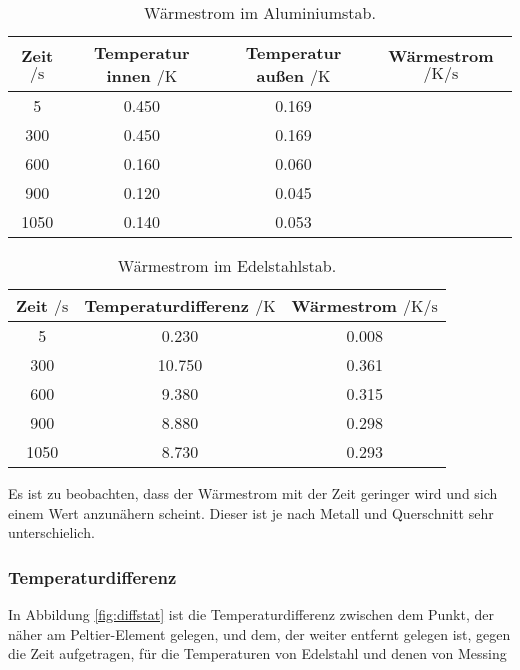   \begin{table}
    \centering
    \caption{Wärmestrom im Aluminiumstab.}
    \label{tabl:stroma}
    \begin{tabular}{c c c c}
      \toprule
      Zeit $\mathbin{/} \si{\s}$ & Temperatur innen $\mathbin{/} \si{\kelvin}$& Temperatur außen $\mathbin{/} \si{\kelvin}$& Wärmestrom $\mathbin{/} \si{\kelvin\per\s}$\\
      \midrule
      5 & 0.450 & 0.169\\
      300 & 0.450 & 0.169\\
      600 & 0.160 & 0.060\\
      900 & 0.120 & 0.045\\
      1050 & 0.140 & 0.053\\
      \bottomrule
    \end{tabular}
  \end{table}

  \begin{table}
    \centering
    \caption{Wärmestrom im Edelstahlstab.}
    \label{tabl:strome}
    \begin{tabular}{c c c}
      \toprule
      Zeit $\mathbin{/} \si{\s}$ & Temperaturdifferenz $\mathbin{/} \si{\kelvin}$& Wärmestrom $\mathbin{/} \si{\kelvin\per\s}$\\
      \midrule
      5 & 0.230& 0.008\\
      300 & 10.750 & 0.361 \\
      600 & 9.380 & 0.315\\
      900 & 8.880 & 0.298\\%
      1050 & 8.730 & 0.293\\%
      \bottomrule
    \end{tabular}
  \end{table}
  \FloatBarrier
  \noindent Es ist zu beobachten, dass der Wärmestrom mit der Zeit geringer wird und sich einem Wert anzunähern scheint. Dieser ist je nach Metall und Querschnitt 
  sehr unterschielich. %

  \subsubsection{Temperaturdifferenz}
  In Abbildung \ref{fig:diffstat} ist die Temperaturdifferenz zwischen dem Punkt, der näher am Peltier-Element gelegen, und dem, der weiter
  entfernt gelegen ist, gegen die Zeit aufgetragen, für die Temperaturen von Edelstahl und denen von Messing


